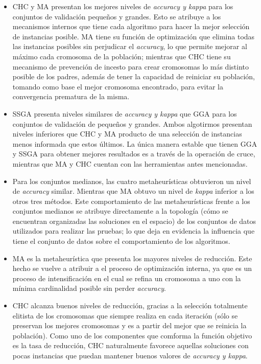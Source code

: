 \begin{itemize}

\item CHC y MA presentan los mejores niveles de \emph{accuracy y kappa} para los conjuntos de validación pequeños y grandes. Esto se atribuye a los mecanismos internos que tiene cada algoritmo para hacer la mejor selección de instancias posible. MA tiene su función de optimización que elimina todas las instancias posibles sin perjudicar el \emph{accuracy}, lo que permite mejorar al máximo cada cromosoma de la población; mientras que CHC tiene su mecanismo de prevención de incesto para crear cromosomas lo más distinto posible de los padres, además de tener la capacidad de reiniciar su población, tomando como base el mejor cromosoma encontrado, para evitar la convergencia prematura de la misma.

\item SSGA presenta niveles similares de \emph{accuracy y kappa} que GGA para los conjuntos de validación de pequeños y grandes. Ambos algotirmos presentan niveles inferiores que CHC y MA producto de una selección de instancias menos informada que estos últimos. La única manera estable que tienen GGA y SSGA para obtener mejores resultados es a través de la operación de cruce, mientras que MA y CHC cuentan con las herramientas antes mencionadas.

\item Para los conjuntos medianos, las cuatro metaheurísticas obtuvieron un nivel de \emph{accuracy} similar. Mientras que MA obtuvo un nivel de \emph{kappa} inferior a los otros tres métodos. Este comportamiento de las metaheurísticas frente a los conjuntos medianos se atribuye directamente a la topología (cómo se encuentran organizadas las soluciones en el espacio) de los conjuntos de datos utilizados para realizar las pruebas; lo que deja en evidencia la influencia que tiene el conjunto de datos sobre el comportamiento de los algoritmos.

\item MA es la metaheurística que presenta los mayores niveles de reducción. Este hecho se vuelve a atribuir a el proceso de optimización interna, ya que es un proceso de intensificación en el cual se refina un cromosoma a uno con la mínima cardinalidad posible sin perder \emph{accuracy}.

\item CHC alcanza buenos niveles de reducción, gracias a la selección totalmente elitista de los cromosomas que siempre realiza en cada iteración (sólo se preservan los mejores cromosomas y es a partir del mejor que se reinicia la población). Como uno de los componentes que comforma la función objetivo es la tasa de reducción, CHC naturalmente favorece aquellas soluciones con pocas instancias que puedan mantener buenos valores de \emph{accuracy y kappa}.


\end{itemize}
